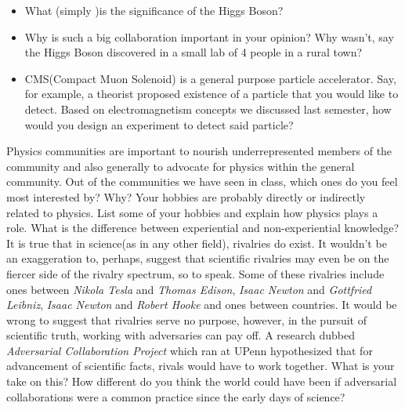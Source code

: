 \documentclass[12pt,addpoints]{exam}
\begin{document}
\begin{questions}
		\begin{itemize}
			\item What (simply )is the significance of the Higgs Boson? \vspace{0.5in}
			\item Why is such a big collaboration important in your opinion? Why wasn't, say the Higgs Boson discovered in a small lab of 4 people in a rural town? \\ \vspace{2in}
			\item CMS(Compact Muon Solenoid) is a general purpose particle accelerator. Say, for example, a theorist proposed existence of a particle that you would like to detect. Based on electromagnetism concepts we discussed last semester, how would you design an experiment to detect said particle?\vspace{2in}
		\end{itemize}
		\question Physics communities are important to nourish underrepresented members of the community and also generally to advocate for physics within the general community. Out of the communities we have seen in class, which ones do you feel most interested by? Why? \vspace{1in}
		\question Your hobbies are probably directly or indirectly related to physics. List some of your hobbies and explain how physics plays a role. \vspace{2in}
		\question What is the difference between experiential and non-experiential knowledge?\vspace{1in}
		\question It is true that in science(as in any other field), rivalries do exist. It wouldn't be an exaggeration to, perhaps, suggest that scientific rivalries may even be on the fiercer side of the rivalry spectrum, so to speak. Some of these rivalries include ones between \textit{Nikola Tesla} and \textit{Thomas Edison}, \textit{Isaac Newton} and \textit{Gottfried Leibniz}, \textit{Isaac Newton} and \textit{Robert Hooke} and ones between countries. It would be wrong to suggest that rivalries serve no purpose, however, in the pursuit of scientific truth, working with adversaries can pay off. A research  dubbed \textit{Adversarial Collaboration Project} which ran at UPenn hypothesized that for advancement of scientific facts, rivals would have to work together. What is your take on this? How different do you think the world could have been if adversarial collaborations were a common practice since the early days of science?\vspace{2in}
		\begin{center}

\end{center}
\end{questions}
\end{document}

